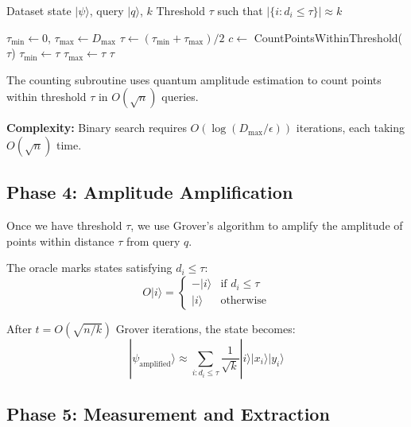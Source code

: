 \documentclass[11pt]{article}
\begin{document}
\begin{algorithm}
\caption{EstimateThreshold}
\begin{algorithmic}[1]
\REQUIRE Dataset state $|\psi\rangle$, query $|q\rangle$, $k$
\ENSURE Threshold $\tau$ such that $|\{i: d_i \leq \tau\}| \approx k$

\STATE $\tau_{\min} \leftarrow 0$, $\tau_{\max} \leftarrow D_{\max}$ 
\WHILE{$\tau_{\max} - \tau_{\min} > \epsilon$}
    \STATE $\tau \leftarrow (\tau_{\min} + \tau_{\max})/2$
    \STATE $c \leftarrow$ CountPointsWithinThreshold($\tau$) 
        \STATE $\tau_{\min} \leftarrow \tau$
    \ELSE
        \STATE $\tau_{\max} \leftarrow \tau$
    \ENDIF
\ENDWHILE
\RETURN $\tau$
\end{algorithmic}
\end{algorithm}

The counting subroutine uses quantum amplitude estimation to count points within threshold $\tau$ in $O(\sqrt{n})$ queries.

\textbf{Complexity:} Binary search requires $O(\log(D_{\max}/\epsilon))$ iterations, each taking $O(\sqrt{n})$ time.

\subsection{Phase 4: Amplitude Amplification}

Once we have threshold $\tau$, we use Grover's algorithm to amplify the amplitude of points within distance $\tau$ from query $q$.

The oracle marks states satisfying $d_i \leq \tau$:
\begin{equation}
O|i\rangle = \begin{cases}
-|i\rangle & \text{if } d_i \leq \tau \\
|i\rangle & \text{otherwise}
\end{cases}
\end{equation}

After $t = O(\sqrt{n/k})$ Grover iterations, the state becomes:
\begin{equation}
|\psi_{\text{amplified}}\rangle \approx \sum_{i: d_i \leq \tau} \frac{1}{\sqrt{k}} |i\rangle |x_i\rangle |y_i\rangle
\end{equation}

\subsection{Phase 5: Measurement and Extraction}
\end{document}
